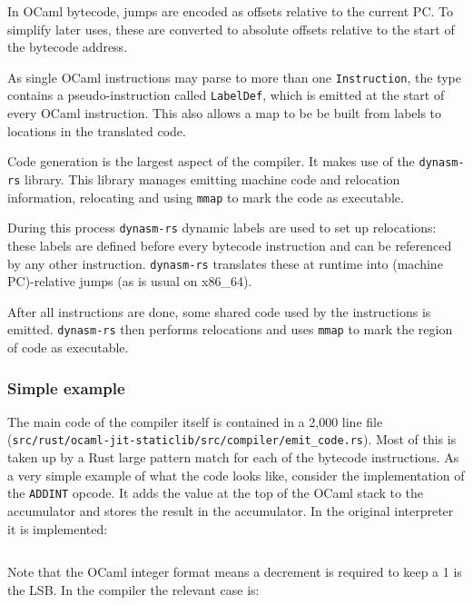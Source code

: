 In OCaml bytecode, jumps are encoded as offsets relative to the current PC. To simplify later uses,
these are converted to absolute offsets relative to the start of the bytecode address.

As single OCaml instructions may parse to more than one \texttt{Instruction}, the type
contains a pseudo-instruction called \texttt{LabelDef}, which is emitted at
the start of every OCaml instruction. This also allows a map to be be built from labels to
locations in the translated code.

\label{code-generation}

Code generation is the largest aspect of the compiler. It makes use of the \texttt{dynasm-rs}
library. This library manages emitting machine code and relocation information, relocating and
using \texttt{mmap} to mark the code as executable.

During this process \texttt{dynasm-rs} dynamic labels are used to set up relocations: these
labels are defined before every bytecode instruction and can be referenced by any other
instruction. \texttt{dynasm-rs} translates these at runtime into (machine PC)-relative jumps (as is
usual on x86\_64).

After all instructions are done, some shared code used by the instructions is emitted.
\texttt{dynasm-rs} then performs relocations and uses \texttt{mmap} to mark the region of code as
executable.

\subsubsection{Simple example}

The main code of the compiler itself is contained in a 2,000 line file
(\texttt{src/rust/ocaml-jit-staticlib/src/compiler/emit\_code.rs}). Most of this is taken up by a
Rust large pattern match for each of the bytecode instructions. As a very simple example of what
the code looks like, consider the implementation of the \texttt{ADDINT} opcode. It adds the value
at the top of the OCaml stack to the accumulator and stores the result in the accumulator. In the
original interpreter it is implemented:

\inputminted{c}{snippets/add.c}

Note that the OCaml integer format means a decrement is required to keep a 1 is the LSB. In the
compiler the relevant case is:

\inputminted{rust}{snippets/add.rs}

